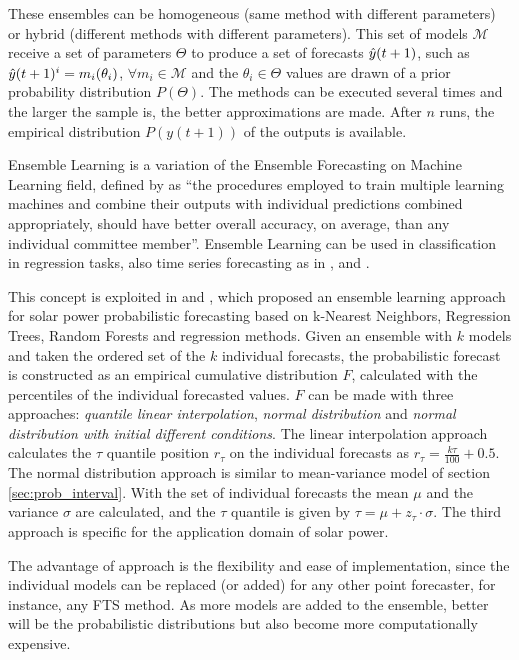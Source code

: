 These ensembles can be homogeneous (same method with different parameters) or hybrid (different methods with different parameters). This set of models $\mathcal{M}$ receive a set of parameters $\Theta$ to produce a set of forecasts $\hat{y}(t+1)$, such as $\hat{y}(t+1)^i = m_i(\theta_i)$, $\forall m_i \in \mathcal{M}$ and the $\theta_i\in \Theta$ values are drawn of a prior probability distribution $P(\Theta)$. The methods can be executed several times and the larger the sample is, the better approximations are made. After $n$ runs, the empirical distribution $P(y(t+1))$ of the outputs is available.

Ensemble Learning is a variation of the Ensemble Forecasting on Machine Learning field, defined by \cite{Brown2010} as ``the procedures employed to train multiple learning machines and combine their outputs with individual predictions combined appropriately, should have better overall accuracy, on average, than any individual committee member''. Ensemble Learning can be used in classification in regression tasks, also time series forecasting as in \cite{Chen2005}, \cite{Bai2010} and \cite{Koskova2015a}.

This concept is exploited in \cite{Mohammed2015} and \cite{Mohammed2016},  which proposed an ensemble learning approach for solar power probabilistic forecasting based on k-Nearest Neighbors, Regression Trees, Random Forests and regression methods. Given an ensemble with $k$ models and taken the ordered set of the $k$ individual forecasts, the probabilistic forecast is constructed as an empirical cumulative distribution $F$, calculated with the percentiles of the individual forecasted values. $F$ can be made with three approaches: \textit{quantile linear interpolation}, \textit{normal distribution} and \textit{normal distribution with initial different conditions}. The linear interpolation approach calculates the $\tau$ quantile position $r_\tau$ on the individual forecasts as $r_\tau = \frac{k\tau}{100}+0.5$. The normal distribution approach is similar to mean-variance model of section \ref{sec:prob_interval}. With the set of individual forecasts the mean $\mu$ and the variance $\sigma$ are calculated, and the $\tau$ quantile is given by $\tau = \mu + z_\tau\cdot\sigma$. The third approach is specific for the application domain of solar power.

The advantage of \cite{Mohammed2015} approach is the flexibility and ease of implementation, since the individual models can be replaced (or added) for any other point forecaster, for instance, any FTS method. As more models are added to the ensemble, better will be the probabilistic distributions but also become more computationally expensive. 

